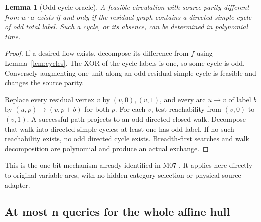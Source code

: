 \documentclass[11pt,letterpaper]{article}
\newtheorem{lemma}[theorem]{Lemma}
\theoremstyle{definition}
\begin{document}
\begin{lemma}[Odd-cycle oracle]\label{lem:odd}
A feasible circulation with source parity different from $w\cdot a$ exists if and only if the residual graph contains a directed simple cycle of odd total label. Such a cycle, or its absence, can be determined in polynomial time.
\end{lemma}
\begin{proof}
If a desired flow exists, decompose its difference from $f$ using Lemma~\ref{lem:cycles}. The XOR of the cycle labels is one, so some cycle is odd. Conversely augmenting one unit along an odd residual simple cycle is feasible and changes the source parity.

Replace every residual vertex $v$ by $(v,0),(v,1)$, and every arc $u\to v$ of label $b$ by $(u,p)\to(v,p+b)$ for both $p$. For each $v$, test reachability from $(v,0)$ to $(v,1)$. A successful path projects to an odd directed closed walk. Decompose that walk into directed simple cycles; at least one has odd label. If no such reachability exists, no odd directed cycle exists. Breadth-first searches and walk decomposition are polynomial and produce an actual exchange.
\end{proof}

This is the one-bit mechanism already identified in M07 \cite{m07}. It applies here directly to original variable arcs, with no hidden category-selection or physical-source adapter.

\subsection{At most n queries for the whole affine hull}
\end{document}
